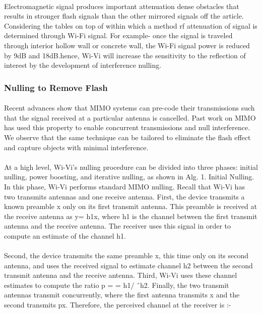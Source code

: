 \documentclass[a4paper,12pt,oneside]{article}
\begin{document}
\paragraph{}
Electromagnetic signal produces important attenuation dense obstacles that results in
stronger flash signals than the other mirrored signals off the article. Considering the tables on top
of within which a method rf attenuation of signal is determined through Wi-Fi signal. For
example- once the signal is traveled through interior hollow wall or concrete wall, the Wi-Fi
signal power is reduced by 9dB and 18dB.hence, Wi-Vi will increase the sensitivity to the reflection of interest by the development of interference nulling.
\subsubsection{Nulling to Remove Flash}
\paragraph{}
Recent advances show that MIMO systems can pre-code their transmissions such that the
signal received at a particular antenna is cancelled. Past work on MIMO has used this property to
enable concurrent transmissions and null interference. We observe that the same technique can be
tailored to eliminate the flash effect and capture objects with minimal interference.
\paragraph{}
At a high level, Wi-Vi’s nulling procedure can be divided into three phases: initial
nulling, power boosting, and iterative nulling, as shown in Alg. 1. Initial Nulling. In this phase,
Wi-Vi performs standard MIMO nulling. Recall that Wi-Vi has two transmits antennas and one
receive antenna. First, the device transmits a known preamble x only on its first transmit antenna.
This preamble is received at the receive antenna as y= h1x, where h1 is the channel between the
first transmit antenna and the receive antenna. The receiver uses this signal in order to compute
an estimate of the channel h1.
\paragraph{}
Second, the device transmits the same preamble x, this time only on its second antenna, and
uses the received signal to estimate channel h2 between the second transmit antenna and the
receive antenna. Third, Wi-Vi uses these channel estimates to compute the ratio p = = h1/ ˆh2.
Finally, the two transmit antennas transmit concurrently, where the first antenna transmits x and
the second transmits px. Therefore, the perceived channel at the receiver is :-
\end{document}
